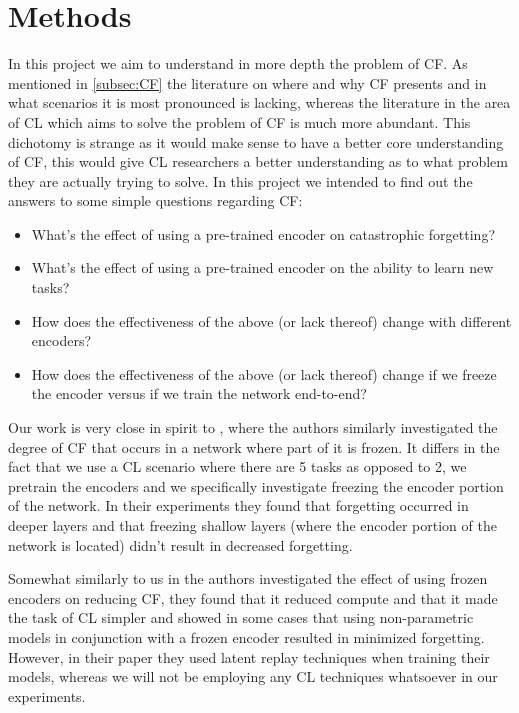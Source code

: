 \section{Methods}
\label{sec:methods}
In this project we aim to understand in more depth the problem of CF. As mentioned in \cref{subsec:CF} the literature on where and why CF presents and in what scenarios it is most pronounced is lacking, whereas the literature in the area of CL which aims to solve the problem of CF is much more abundant. This dichotomy is strange as it would make sense to have a better core understanding of CF, this would give CL researchers a better understanding as to what problem they are actually trying to solve. In this project we intended to find out the answers to some simple questions regarding CF:
\begin{itemize}
    \item What's the effect of using a pre-trained encoder on catastrophic forgetting?
    \item What's the effect of using a pre-trained encoder on the ability to learn new tasks?
    \item How does the effectiveness of the above (or lack thereof) change with different encoders?
    \item How does the effectiveness of the above (or lack thereof) change if we freeze the encoder versus if we train the network end-to-end?
\end{itemize}
Our work is very close in spirit to \cite{ramasesh2020anatomy}, where the authors similarly investigated the degree of CF that occurs in a network where part of it is frozen. It differs in the fact that we use a CL scenario where there are 5 tasks as opposed to 2, we pretrain the encoders and we specifically investigate freezing the encoder portion of the network. In their experiments they found that forgetting occurred in deeper layers and that freezing shallow layers (where the encoder portion of the network is located) didn't result in decreased forgetting. 

Somewhat similarly to us in \cite{ostapenko2022continual} the authors investigated the effect of using frozen encoders on reducing CF, they found that it reduced compute and that it made the task of CL simpler and showed in some cases that using non-parametric models in conjunction with a frozen encoder resulted in minimized forgetting. However, in their paper they used latent replay techniques when training their models, whereas we will not be employing any CL techniques whatsoever in our experiments. 

